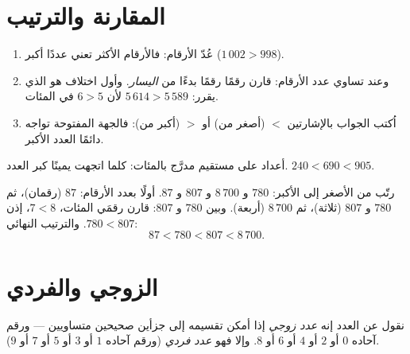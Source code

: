 \section{المقارنة والترتيب}

\begin{method}\label{met:g3:numbers:compare}
\begin{enumerate}
  \item عُدّ الأرقام: فالأرقام الأكثر تعني عددًا أكبر
        ($1\,002 > 998$).
  \item وعند تساوي عدد الأرقام: قارن رقمًا رقمًا بدءًا من
        \emph{اليسار}. وأول اختلاف هو الذي يقرر:
        $5\,614 > 5\,589$ لأن $6 > 5$ في المئات.
  \item اُكتب الجواب بالإشارتين $<$ (أصغر من) أو $>$
        (أكبر من): فالجهة المفتوحة تواجه دائمًا العدد الأكبر.
\end{enumerate}
\end{method}

\begin{omfigure}

{\small أعداد على مستقيم مدرَّج بالمئات: كلما اتجهت يمينًا كبر
العدد. $240 < 690 < 905$.}
\end{omfigure}

\begin{example}\label{ex:g3:numbers:order}
رتّب من الأصغر إلى الأكبر: $780$ و $8\,700$ و $807$ و $87$.
أولًا بعدد الأرقام: $87$ (رقمان)، ثم $780$ و $807$
(ثلاثة)، ثم $8\,700$ (أربعة). وبين $780$ و $807$: قارن رقمَي
المئات، $7 < 8$، إذن $780 < 807$. والترتيب النهائي:
\[
87 < 780 < 807 < 8\,700 .
\]
\end{example}

\section{الزوجي والفردي}

\begin{definition}\label{def:g3:numbers:evenodd}
نقول عن العدد إنه \emph{عدد زوجي} إذا أمكن
تقسيمه إلى جزأين صحيحين متساويين --- ورقم آحاده $0$ أو $2$ أو $4$
أو $6$ أو $8$. وإلا فهو \emph{عدد فردي} (ورقم
آحاده $1$ أو $3$ أو $5$ أو $7$ أو $9$).
\end{definition}


